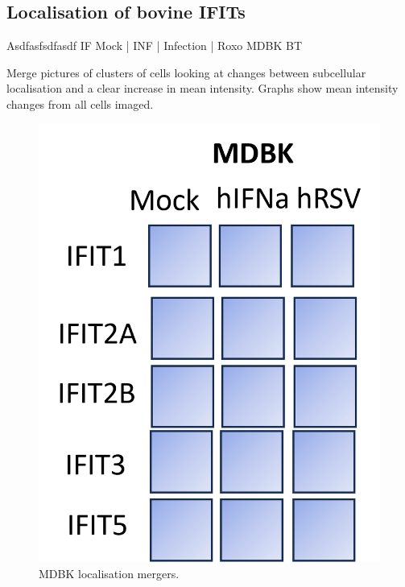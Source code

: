 \subsection{Localisation of bovine IFITs}
Asdfasfsdfasdf \newline
IF Mock | INF | Infection | Roxo \newline
MDBK BT

Merge pictures of clusters of cells looking at changes between subcellular localisation and a clear increase in mean intensity. Graphs show mean intensity changes from all cells imaged.

\begin{figure}
    \centering
    \includegraphics[width=1\linewidth]{07. Chapter 2/Figs/03. Localisation/01. mdbk merges.png}
    \caption[MDBK localisation mergers.]{MDBK localisation mergers.}
    \label{MDBK localisation mergers.}
\end{figure}



